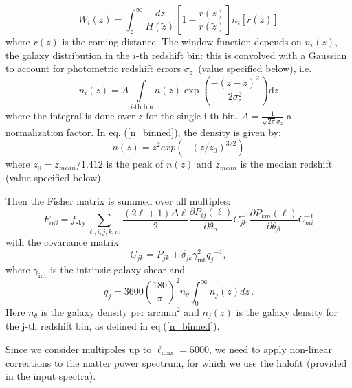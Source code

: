 \begin{equation}
 W_i(z) = \int^\infty_z \frac{d\tilde{z}}{H(\tilde{z})}\left[ 1 - \frac{r(z)}{r(\tilde{z})} \right] n_i[r(\tilde{z})]
\end{equation}
where $r(z)$ is the coming distance.
The window function depends on $n_{i}(z)$, the galaxy distribution
in the $i$-th redshift bin: this is convolved with a Gaussian to account for photometric
redshift errors $\sigma_{z}$~(value specified below), i.e. 
\begin{equation}
n_{i}(z)=A \int\limits _{i\text{-th bin}}n({z})\exp\left(\frac{-(\tilde{z}-z)^{2}}{2 \sigma_{z}^{2}}\right)\mathrm{d}\tilde{z}
\label{n_binned}
\end{equation}
 where the integral is done over $\tilde{z}$ for the single i-th bin. 
$A = \frac{1}{\sqrt{2\pi} \sigma_z}$ a normalization factor.
In eq. (\ref{n_binned}), the density is given by: 
\begin{equation}
n(z) = z^2 exp(-(z/z_0)^{3/2})
\end{equation}
where $z_0 = z_{mean}/1.412$ is the peak of $n(z)$ and $z_{mean}$ is the median redshift (value specified below).

Then the Fisher matrix is summed over all multiples:
\begin{equation}
F_{\alpha\beta}=f_{\mathrm{sky}}\sum\limits _{\ell,i,j,k,m}\frac{(2\ell+1)\Delta\ell}{2}\frac{\partial P_{ij}(\ell)}{\partial\theta_{\alpha}}C_{jk}^{-1}\frac{\partial P_{km}(\ell)}{\partial\theta_{\beta}}C_{mi}^{-1}\label{eq:fm-wl}
\end{equation}
 with the covariance matrix 
\begin{equation}
C_{jk}=P_{jk}+\delta_{jk}\gamma_{\mathrm{int}}^{2}{{{q}}_j}^{-1},
\end{equation}
 where $\gamma_{\mathrm{int}}$ is the
intrinsic galaxy shear  and 
\begin{equation}
q_{j} = 3600\left(\frac{180}{\pi}\right)^{2} n_{\theta} \int^\infty_0 n_j(z) dz \, .
\end{equation}
Here $n_{\theta}$ is the galaxy density per $\mathrm{arcmin}^{2}$ and $n_j(z)$ is the galaxy density for the j-th redshift bin, as defined in eq.(\ref{n_binned}).

Since we consider multipoles up to $\ell_{\mathrm{max}}=5000$,
we need to apply non-linear corrections to the matter power spectrum,
for which we use the halofit (provided in the input spectra).

